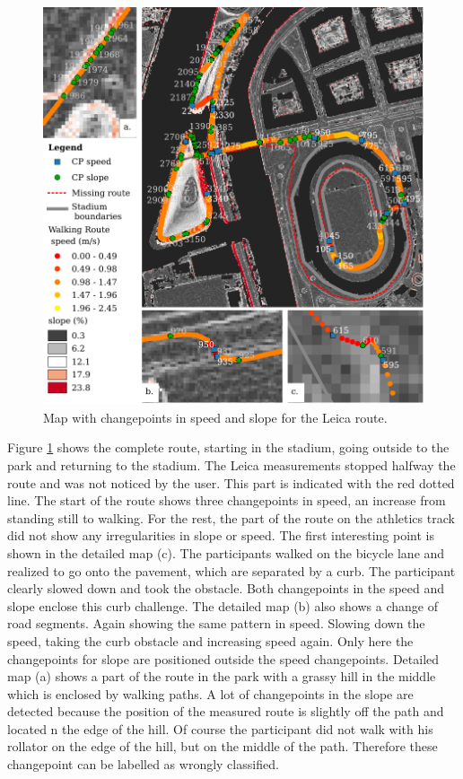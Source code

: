 \begin{figure}[ht]
\includegraphics[width=\textwidth]{img/R_leicaroute.pdf}
\centering
\caption{Map with changepoints in speed and slope for the Leica route.\label{routeLeicaMap}}
\end{figure}

Figure \ref{routeLeicaMap} shows the complete route, starting in the stadium, going outside to the park and returning to the stadium. The Leica measurements stopped halfway the route and was not noticed by the user. This part is indicated with the red dotted line. The start of the route shows three changepoints in speed, an increase from standing still to walking. For the rest, the part of the route on the athletics track did not show any irregularities in slope or speed. The first interesting point is shown in the detailed map (c). The participants walked on the bicycle lane and realized to go onto the pavement, which are separated by a curb. The participant clearly slowed down and took the obstacle. Both changepoints in the speed and slope enclose this curb challenge. 
The detailed map (b) also shows a change of road segments. Again showing the same pattern in speed. Slowing down the speed, taking the curb obstacle and increasing speed again. Only here the changepoints for slope are positioned outside the speed changepoints. Detailed map (a) shows a part of the route in the park with a grassy hill in the middle which is enclosed by walking paths. A lot of changepoints in the slope are detected because the position of the measured route is slightly off the path and located n the edge of the hill. Of course the participant did not walk with his rollator on the edge of the hill, but on the middle of the path. Therefore these changepoint can be labelled as wrongly classified. 

